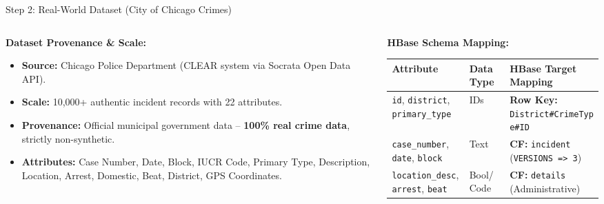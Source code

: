 \documentclass[aspectratio=169]{beamer}
\begin{document}
\begin{frame}{Step 2: Real-World Dataset (City of Chicago Crimes)}
    \begin{columns}[T]
        \begin{column}{0.42\textwidth}
            \textbf{\textcolor{NavyBlue}{Dataset Provenance \& Scale:}}
            \vspace{0.05cm}
            \begin{itemize}\footnotesize
                \setlength{\itemsep}{2pt}
                \item \textbf{Source:} Chicago Police Department (CLEAR system via Socrata Open Data API).
                \item \textbf{Scale:} 10,000+ authentic incident records with 22 attributes.
                \item \textbf{Provenance:} Official municipal government data -- \textbf{100\% real crime data}, strictly non-synthetic.
                \item \textbf{Attributes:} Case Number, Date, Block, IUCR Code, Primary Type, Description, Location, Arrest, Domestic, Beat, District, GPS Coordinates.
            \end{itemize}
        \end{column}
        \begin{column}{0.55\textwidth}
            \textbf{\textcolor{NavyBlue}{HBase Schema Mapping:}}
            \vspace{0.04cm}
            \begin{table}
                \centering
                \fontsize{5.2}{6.8}\selectfont
                \setlength{\tabcolsep}{2.5pt}
                \begin{tabular}{p{2.3cm}p{1.0cm}p{3.5cm}}
                    \toprule
                    \textbf{Attribute} & \textbf{Data Type} & \textbf{HBase Target Mapping} \\
                    \midrule
                    \texttt{id}, \texttt{district}, \texttt{primary\_type} & IDs & \textbf{Row Key:} \texttt{District\#CrimeType\#ID} \\
                    \texttt{case\_number}, \texttt{date}, \texttt{block} & Text & \textbf{CF:} \texttt{incident} (\texttt{VERSIONS => 3}) \\
                    \texttt{location\_desc}, \texttt{arrest}, \texttt{beat} & Bool/Code & \textbf{CF:} \texttt{details} (Administrative) \\

\end{tabular}
\end{table}
\end{column}
\end{columns}
\end{frame}
\end{document}
